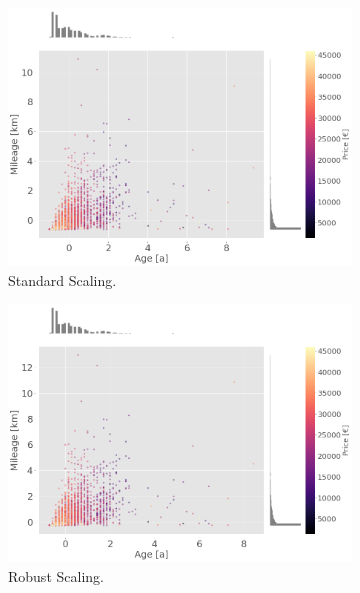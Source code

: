 \begin{figure}
    \centering
    \begin{subfigure}[b]{0.48\textwidth}
        \centering
        \includegraphics[width=\textwidth]{"content/pics/Scatter_Standard.png"}
        \caption{Standard Scaling.}
    \end{subfigure}
    \hfill
    \begin{subfigure}[b]{0.48\textwidth}
        \centering
        \includegraphics[width=\textwidth]{"content/pics/Scatter_Robust.png"}
        \caption{Robust Scaling.}
    \end{subfigure}
    \vfill 
    \begin{subfigure}[b]{0.48\textwidth}
        \centering

\end{subfigure}
\end{figure}
